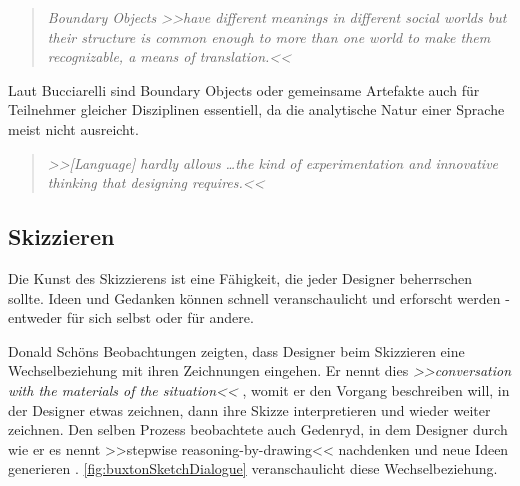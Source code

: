 \begin{quote}
	\textsl{Boundary Objects >>have different meanings in different social worlds but their structure is common enough to more than one world to make them recognizable, a means of translation.<<}
\begin{flushright}\citep{Star:1989}\end{flushright}
\end{quote}

Laut Bucciarelli \citep{Bucciarelli:2002} sind Boundary Objects oder gemeinsame Artefakte auch für Teilnehmer gleicher Disziplinen essentiell, da die analytische Natur einer Sprache meist nicht ausreicht.
\begin{quote}
	\textsl{>>[Language] hardly allows \ldots the kind of experimentation and innovative thinking that designing requires.<<}
\begin{flushright}\citep{Bucciarelli:2002}\end{flushright}
\end{quote}

\subsection{Skizzieren} 
Die Kunst des Skizzierens ist eine Fähigkeit, die jeder Designer beherrschen sollte. Ideen und Gedanken können schnell veranschaulicht und erforscht werden - entweder für sich selbst oder für andere. \citep{Sagmeister:2008} 

\medskip Donald Schöns Beobachtungen zeigten, dass Designer beim Skizzieren eine Wechselbeziehung mit ihren Zeichnungen eingehen. Er nennt dies \emph{>>conversation with the materials of the situation<<} \citep{Schoen:1983}, womit er den Vorgang beschreiben will, in der Designer etwas zeichnen, dann ihre Skizze interpretieren und wieder weiter zeichnen. Den selben Prozess beobachtete auch Gedenryd, in dem Designer durch wie er es nennt >>stepwise reasoning-by-drawing<< nachdenken und neue Ideen generieren \citep{Gedenryd:1998}. \autoref{fig:buxtonSketchDialogue} veranschaulicht diese Wechselbeziehung.


